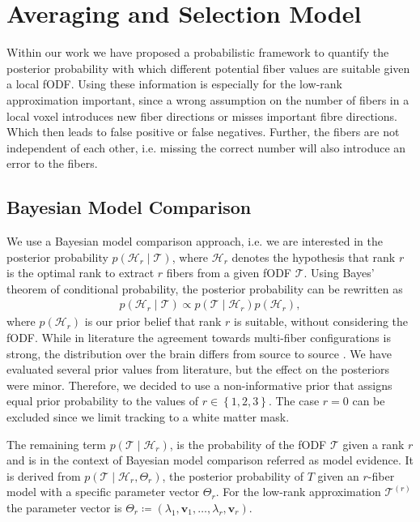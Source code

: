 \section{Averaging and Selection Model}\label{sec:Models}

Within our work we have proposed a probabilistic framework
to quantify the posterior probability with which different potential fiber values
are suitable given a local fODF.
Using these information is especially for the low-rank approximation important,
since a wrong assumption on the number of fibers in a local voxel introduces new
fiber directions or misses important fibre directions. Which then leads to false
positive or false negatives. Further, the fibers are not independent of each
other, i.e. missing the correct number will also introduce an error to the
fibers.

\subsection{Bayesian Model Comparison}
We use a Bayesian model comparison approach, i.e. we are interested in the
posterior probability $p \left( \mathcal{H}_r \mid \mathcal{T} \right)$, where
$\mathcal{H}_r$ denotes the hypothesis that rank $r$ is the optimal rank to
extract $r$ fibers from a given fODF $\mathcal{T}$. Using Bayes' theorem of
conditional probability, the posterior probability can be rewritten as
\begin{align}
	p \left( \mathcal{H}_r \mid \mathcal{T} \right) \propto p \left(
		\mathcal{T} \mid \mathcal{H}_r 
	\right) p \left(  \mathcal{H}_r \right), 
	\label{eq:Bayes}
\end{align}
where $p \left(  \mathcal{H}_r \right)$ is our prior belief that rank $r$ is
suitable, without considering the fODF. While in literature the agreement
towards multi-fiber configurations is strong, the distribution over the brain
differs from source to source  \cite{BEHRENS2007144,Jeurissen:2012, Schultz:MICCAI12}. We have evaluated several  prior values from literature,
but the effect on the posteriors were minor. Therefore, we decided to use a
non-informative prior that assigns equal prior probability to the values of $r
\in \left\{ 1,2,3 \right\}$. The case $r=0$ can be excluded since we limit
tracking to a white matter mask. 

The remaining term $p \left( \mathcal{T} \mid \mathcal{H}_r \right)$, is the
probability of the fODF $\mathcal{T}$ given a rank $r$ and is in the context of
Bayesian model comparison referred as model evidence. It is derived from $p
\left( \mathcal{T} \mid \mathcal{H}_r , \Theta_r \right)$, the posterior
probability of $T$ given an $r$-fiber model with a specific parameter vector
$\Theta_r$. For the low-rank approximation $\mathcal{T}^{\left( r \right)}$ the
parameter vector is $\Theta_r \coloneqq \left( \lambda_1 , \mathbf{v}_1 , \dots
, \lambda_r , \mathbf{v}_r \right)$. 

